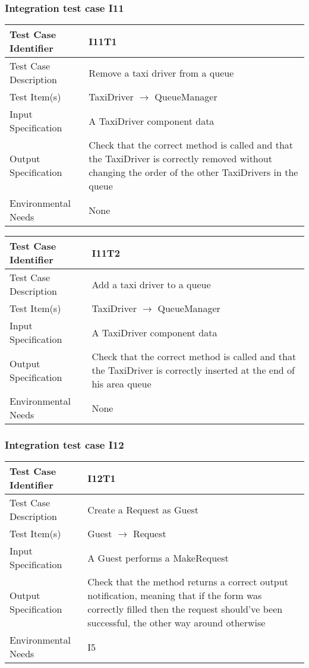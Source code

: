 		\subsubsection{Integration test case I11}
		\begin{center}
			\begin{tabular}{ |l p{10cm}| } \hline
				Test Case Identifier & I11T1 \\ \hline
				Test Case Description & Remove a taxi driver from a queue \\ \hline
				Test Item(s) & TaxiDriver $\rightarrow$ QueueManager \\ \hline
				Input Specification & A TaxiDriver component data \\ \hline
				Output Specification & Check that the correct method is called and that the TaxiDriver is
				correctly removed without changing the order of the other TaxiDrivers in the queue \\ \hline
				Environmental Needs & None \\ \hline
			\end{tabular}
			\begin{tabular}{ |l p{10cm}| } \hline
				Test Case Identifier & I11T2 \\ \hline
				Test Case Description & Add a taxi driver to a queue \\ \hline
				Test Item(s) & TaxiDriver $\rightarrow$ QueueManager \\ \hline
				Input Specification & A TaxiDriver component data \\ \hline
				Output Specification & Check that the correct method is called and that the TaxiDriver is
				correctly inserted at the end of his area queue \\ \hline
				Environmental Needs & None \\ \hline
			\end{tabular}
		\end{center}
		\subsubsection{Integration test case I12}
		\begin{center}
			\begin{tabular}{ |l p{10cm}| } \hline
				Test Case Identifier & I12T1 \\ \hline
				Test Case Description & Create a Request as Guest \\ \hline
				Test Item(s) & Guest $\rightarrow$ Request \\ \hline
				Input Specification & A Guest performs a MakeRequest\\ \hline
				Output Specification & Check that the method returns a correct output notification, meaning that if the form was correctly filled then
				the request should've been successful, the other way around otherwise \\ \hline
				Environmental Needs & I5 \\ \hline
			\end{tabular}
		\end{center}
